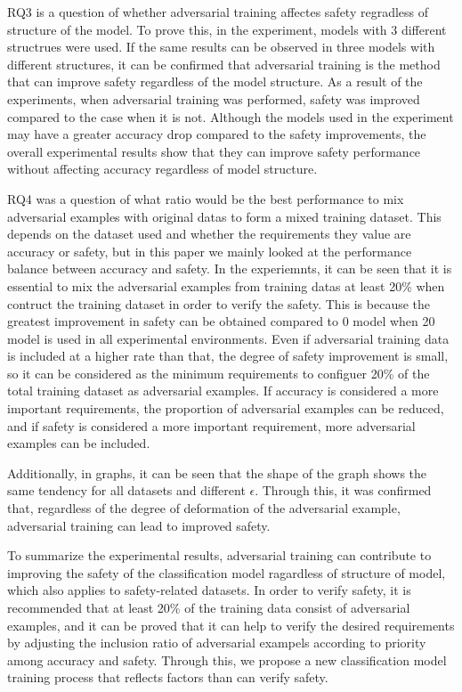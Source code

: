 \documentclass[journal,article,submit,moreauthors,pdftex]{Definitions/mdpi}
\begin{document}
RQ3 is a question of whether adversarial training affectes safety regradless of structure of the model.
To prove this, in the experiment, models with 3 different structrues were used.
If the same results can be observed in three models with different structures, it can be confirmed that adversarial training is the method that can improve safety regardless of the model structure.
As a result of the experiments, when adversarial training was performed, safety was improved compared to the case when it is not.
Although the models used in the experiment may have a greater accuracy drop compared to the safety improvements, the overall experimental results show that they can improve safety performance without affecting accuracy regardless of model structure.

RQ4 was a question of what ratio would be the best performance to mix adversarial examples with original datas to form a mixed training dataset.
This depends on the dataset used and whether the requirements they value are accuracy or safety, but in this paper we mainly looked at the performance balance between accuracy and safety.
In the experiemnts, it can be seen that it is essential to mix the adversarial examples from training datas at least 20\% when contruct the training dataset in order to verify the safety.
This is because the greatest improvement in safety can be obtained compared to 0 model when 20 model is used in all experimental environments.
Even if adversarial training data is included at a higher rate than that, the degree of safety improvement is small, so it can be considered as the minimum requirements to configuer 20\% of the total training dataset as adversarial examples.
If accuracy is considered a more important requirements, the proportion of adversarial examples can be reduced, and if safety is considered a more important requirement, more adversarial examples can be included.

Additionally, in graphs, it can be seen that the shape of the graph shows the same tendency for all datasets and different \begin{math}\epsilon\end{math}.
Through this, it was confirmed that, regardless of the degree of deformation of the adversarial example, adversarial training can lead to improved safety.

To summarize the experimental results, adversarial training can contribute to improving the safety of the classification model ragardless of structure of model, which also applies to safety-related datasets.
In order to verify safety, it is recommended that at least 20\% of the training data consist of adversarial examples, and it can be proved that it can help to verify the desired requirements by adjusting the inclusion ratio of adversarial exampels according to priority among accuracy and safety.
Through this, we propose a new classification model training process that reflects factors than can verify safety.
\end{document}
